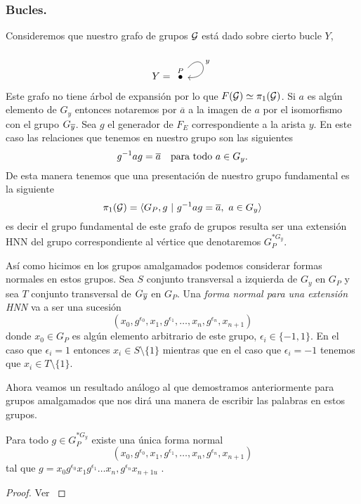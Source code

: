 \documentclass[tesis.tex]{subfiles}
\begin{document}
\subsubsection{Bucles.}
Consideremos que nuestro grafo de grupos ${\cal G}$ está dado sobre cierto bucle $Y$,
\[
Y = 	\begin{tikzcd}
	\overset{P}{\bullet} \arrow["y", loop, distance=2.5em, in=355, out=50]
	\end{tikzcd}
\]
Este grafo no tiene árbol de expansión por lo que $F({\cal G}) \simeq \pi_1({\cal G})$.
Si $a$ es algún elemento de $G_y$ entonces notaremos por $\overline{a}$ a la imagen de $a$ por el isomorfismo con el grupo $G_{\overline y}$.
Sea $g$ el generador de $F_{E}$ correspondiente a la arista $y$. 
En este caso las relaciones que tenemos en nuestro grupo son las siguientes
\[
	g^{-1}ag = \ol{a}  \  \ \ \text{para todo} \ a \in G_y.
\]   
De esta manera tenemos que una presentación de nuestro grupo fundamental es la siguiente
\[
	\pi_1({\cal G}) = \langle G_P, g \ | \ g^{-1}ag = \overline{a}, \ a \in G_y \rangle
\]
es decir el grupo fundamental de este grafo de grupos resulta ser una extensión HNN del grupo correspondiente al vértice que denotaremos $G_P^{\ast G_y}$.

Así como hicimos en los grupos amalgamados podemos considerar formas normales en estos grupos.
Sea $S$ conjunto transversal a izquierda de $G_y$ en $G_P$ y sea $T$ conjunto transversal de $G_{\overline y}$ en $G_P$.
Una \emph{forma normal para una extensión HNN} va a ser una sucesión 
\[
	(x_{0},g^{\epsilon_0},x_{1},g^{\epsilon_1}, \dots, x_{n},g^{\epsilon_n},x_{n+1})
\]
 donde $x_0 \in G_P$ es algún elemento arbitrario de este grupo, $\epsilon_{i} \in \{ -1,1 \}$.
En el caso que $\epsilon_{i} = 1$ entonces $x_i \in S \setminus \{ 1\}$ mientras que en el caso que $\epsilon_{i} = -1$ tenemos que $x_{i} \in T \setminus \{ 1 \}$. 


Ahora veamos un resultado análogo al que demostramos anteriormente para grupos amalgamados que nos dirá una manera de escribir las palabras en estos grupos.

\begin{prop}\label{prop_hnn_formanormal}
	Para todo $g \in G_P^{\ast G_y}$ existe una única forma normal 
	\[
		(x_{0},g^{\epsilon_0},x_{1},g^{\epsilon_1}, \dots, x_{n},g^{\epsilon_n},x_{n+1})
	\]
	 tal que $g = x_{0}g^{\epsilon_0}x_{1}g^{\epsilon_1} \dots x_{n},g^{\epsilon_n}x_{n+1u} $ .
\end{prop}
\begin{proof}
	Ver \cite{lyndon1977combinatorial}
\end{proof}
\end{document}
